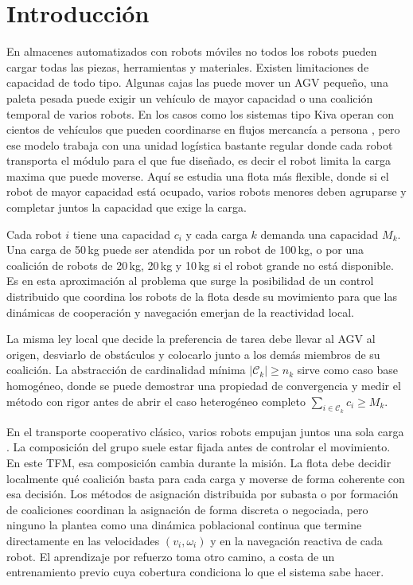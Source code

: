 ﻿%
\section{Introducción}
\label{sec:intro}

En almacenes automatizados con robots móviles no todos los robots pueden cargar todas las piezas, herramientas y materiales. Existen limitaciones de capacidad de todo tipo.
Algunas cajas las puede mover un AGV pequeño, una paleta pesada puede exigir un vehículo de mayor
capacidad o una coalición temporal de varios robots. En los casos como los sistemas tipo Kiva operan
con cientos de vehículos que pueden coordinarse en flujos mercancía a persona
\citep{wurman2008coordinating}, pero ese modelo trabaja con una unidad logística bastante
regular donde cada robot transporta el módulo para el que fue diseñado, es decir el robot limita la carga maxima que puede moverse. 
Aquí se estudia una flota más flexible, donde si el robot de mayor capacidad está ocupado, varios robots menores
deben agruparse y completar juntos la capacidad que exige la carga.

Cada robot $i$ tiene una capacidad $c_i$ y cada carga $k$
demanda una capacidad $M_k$. Una carga de 50\,kg puede ser atendida por un robot de
100\,kg, o por una coalición de robots de 20\,kg, 20\,kg y 10\,kg si el robot grande no
está disponible. Es en esta aproximación al problema que surge la posibilidad de un control distribuido que coordina los robots de la flota desde su movimiento para que las dinámicas de cooperación y navegación emerjan de la reactividad local. 

La misma ley local que decide la preferencia de tarea debe llevar al AGV al origen, desviarlo de obstáculos
y colocarlo junto a los demás miembros de su coalición.
La abstracción de cardinalidad mínima $|\mathcal{C}_k|\geq n_k$ sirve como caso base
homogéneo, donde se puede demostrar una propiedad de convergencia y medir el método con
rigor antes de abrir el caso heterogéneo completo $\sum_{i\in\mathcal{C}_k}c_i\geq M_k$.

En el transporte cooperativo clásico, varios robots empujan juntos una sola carga
\citep{ebel2024cooperative, rosenfelder2024force}. La composición del grupo suele estar
fijada antes de controlar el movimiento. En este TFM, esa composición cambia durante la
misión. La flota debe decidir localmente qué coalición basta para cada carga y moverse
de forma coherente con esa decisión. Los métodos de asignación distribuida por subasta
\citep{choi2009consensus} o por formación de coaliciones
\citep{dutta2021hedonic, shan2024distributed} coordinan la asignación de forma discreta
o negociada, pero ninguno la plantea como una dinámica poblacional continua que termine
directamente en las velocidades $(v_i,\omega_i)$ y en la navegación reactiva de cada
robot. El aprendizaje por refuerzo \citep{bezerra2025learning} toma otro camino, a costa de un
entrenamiento previo cuya cobertura condiciona lo que el sistema sabe hacer.

